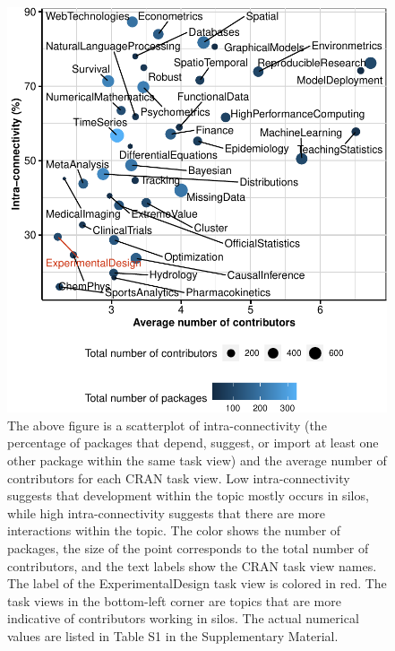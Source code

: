 \begin{figure}[htbp]

{\centering \includegraphics{figures/ctv-summ-plot-1} 

}

\caption{The above figure is a scatterplot of intra-connectivity (the percentage of packages that depend, suggest, or import at least one other package within the same task view) and the average number of contributors for each CRAN task view. Low intra-connectivity suggests that development within the topic mostly occurs in silos, while high intra-connectivity suggests that there are more interactions within the topic. The color shows the number of packages, the size of the point corresponds to the total number of contributors, and the text labels show the CRAN task view names.  The label of the ExperimentalDesign task view is colored in red. The task views in the bottom-left corner are topics that are more indicative of contributors working in silos. The actual numerical values are listed in Table S1 in the Supplementary Material.}\label{fig:ctv-summ-plot}
\end{figure}

